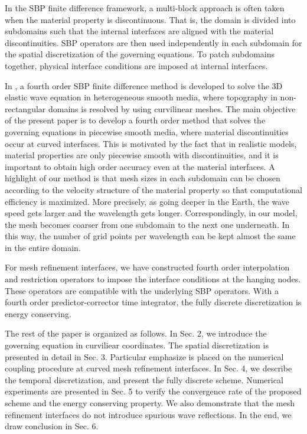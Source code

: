 In the SBP finite difference framework, a multi-block approach is often taken when the material property is discontinuous. That is, the domain is divided into subdomains such that the internal interfaces are aligned with the material discontinuities. SBP operators are then used independently in each subdomain for the spatial discretization of the governing equations. To patch subdomains together, physical interface conditions are imposed at internal interfaces. 



In \cite{petersson2015wave}, a fourth order SBP finite difference method is developed to solve the 3D elastic wave equation in heterogeneous smooth media, where topography in non-rectangular domains is resolved by using curvilinear meshes. The main objective of the present paper is to develop a fourth order method that solves the governing equations in piecewise smooth media, where material discontinuities occur at curved interfaces. This is motivated by the fact that in realistic models, material properties are only piecewise smooth with discontinuities, and it is important to obtain high order accuracy even at the material interfaces. A highlight of our method is that  mesh sizes in each subdomain can be chosen according to the velocity structure of the material property so that computational efficiency is maximized. More precisely, as going deeper in the Earth, the wave speed gets larger and the wavelength gets longer. Correspondingly, in our model, the mesh becomes coarser from one subdomain to the next one underneath. In this way, the number of grid points per wavelength can be kept almost the same in the entire domain. 

For mesh refinement interfaces, we have constructed fourth order interpolation and restriction operators to impose the interface conditions at the hanging nodes. These operators are compatible with the underlying SBP operators. With a fourth order predictor-corrector time integrator, the fully discrete discretization is energy conserving. 

The rest of the paper is organized as follows. In Sec. 2, we introduce the governing equation in curviliear coordinates. The spatial discretization is presented in detail in Sec. 3. Particular emphasize is placed on the numerical coupling procedure at curved mesh refinement interfaces. In Sec. 4, we describe the temporal discretization, and present the fully discrete scheme. Numerical experiments are presented in Sec. 5 to verify the convergence rate of the proposed scheme and the energy conserving property. We also demonstrate that the mesh refinement interfaces do not introduce spurious wave reflections. In the end, we draw conclusion in Sec. 6. 
